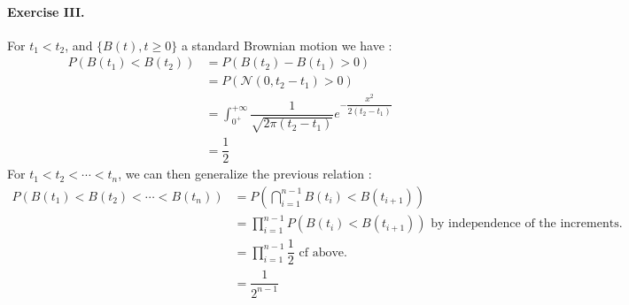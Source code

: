\documentclass{article}
\begin{document}
\paragraph{Exercise III.\\}
For $t_1<t_2$, and $\{ B(t), t\geq 0 \}$ a standard Brownian motion we have :
\begin{align*}
P\left( B(t_1)<B(t_2) \right) &= P\left( B(t_2)-B(t_1)>0 \right) \\
 &=P\left(\mathcal{N}(0,t_2-t_1)>0 \right) \\
&=\int_{0^+}^{+\infty}\dfrac{1}{\sqrt{2\pi (t_2-t_1)}}e^{-\dfrac{x^2}{2(t_2-t_1)}} \\
&=\dfrac{1}{2}
\end{align*}
For $t_1<t_2<\cdots<t_n$, we can then generalize the previous relation :
\begin{align*}
P\left( B(t_1)<B(t_2)<\cdots<B(t_n) \right) &= P\left( \bigcap_{i=1}^{n-1} B(t_i)<B(t_{i+1})\right) \\
 &=\prod_{i=1}^{n-1} P\left(  B(t_i)<B(t_{i+1})\right)\text{ by independence of the increments.} \\
&=\prod_{i=1}^{n-1} \dfrac{1}{2}\text{ cf above.} \\
&=\dfrac{1}{2^{n-1}}
\end{align*}
\end{document}

